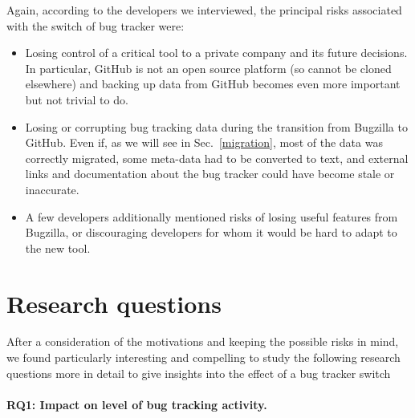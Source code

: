 \documentclass[conference]{IEEEtran}
\begin{document}
Again, according to the developers we interviewed, the principal risks associated with the switch of bug tracker were:
\begin{itemize}
\item Losing control of a critical tool to a private company and its future decisions. In particular, GitHub is not an open source platform (so cannot be cloned elsewhere) and backing up data from GitHub becomes even more important but not trivial to do.
\item Losing or corrupting bug tracking data during the transition from Bugzilla to GitHub. Even if, as we will see in Sec.~\ref{migration}, most of the data was correctly migrated, some meta-data had to be converted to text, and external links and documentation about the bug tracker could have become stale or inaccurate. %
\item A few developers additionally mentioned risks of losing useful features from Bugzilla, or discouraging developers for whom it would be hard to adapt to the new tool.
\end{itemize}

\section{Research questions}
After a consideration of the motivations and keeping the possible risks in mind, we found particularly interesting and compelling to study the following research questions more in detail to give insights into the effect of a bug tracker switch
\label{research_questions}


\paragraph{RQ1: Impact on level of bug tracking activity.}
\end{document}
